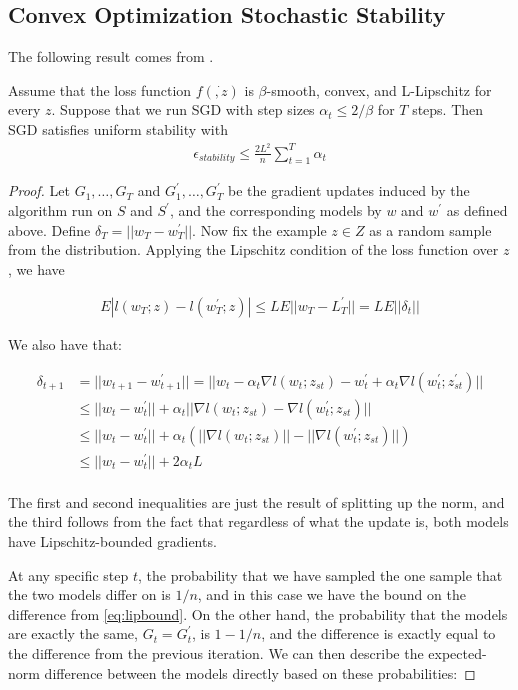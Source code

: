 \documentclass[12pt]{report}
\begin{document}
\subsection{Convex Optimization Stochastic Stability}
The following result comes from \cite{hardt2015train}.
\begin{theorem}
\label{ThmNeat}
Assume that the loss function $f(\dot{,z})$ is $\beta$-smooth, convex, and L-Lipschitz for every $z$. Suppose that we run SGD with step sizes $\alpha_t \leq 2/\beta$ for $T$ steps. Then SGD satisfies uniform stability with
\begin{align}
\epsilon_{stability} \leq \frac{2L^2}{n}\sum_{t=1}^T \alpha_t
\end{align}
\end{theorem}

\begin{proof}
Let $G_1,\ldots,G_T$ and $G_1^\prime,\ldots,G_T^\prime$ be the gradient updates induced by the algorithm run on $S$ and $S^\prime$, and the corresponding models by $w$ and $w^\prime$ as defined above. Define $\delta_T = ||w_T - w_T^\prime||$. Now fix the example $z \in Z$ as a random sample from the distribution. Applying the Lipschitz condition of the loss function over $z$, we have

\begin{align} \label{eq:explip}
E |l(w_T;z) - l(w_T^\prime;z)| \leq L E||w_T - L_T^\prime|| = L E||\delta_t||
\end{align}

We also have that:

\begin{align} \label{eq:lipbound}
\delta_{t+1} &= || w_{t+1} - w_{t+1}^\prime|| = ||w_t - \alpha_t \nabla l(w_t;z_{st}) - w_t^\prime + \alpha_t \nabla l(w_t^\prime;z_{st}^\prime) || \\
&\leq ||w_t - w_t^\prime|| + \alpha_t ||\nabla l(w_t;z_{st}) - \nabla l(w_t^\prime;z_{st})|| \\
&\leq ||w_t - w_t^\prime|| + \alpha_t( ||\nabla l(w_t;z_{st})|| - ||\nabla l(w_t^\prime;z_{st})|| )\\
&\leq ||w_t - w_t^\prime|| + 2\alpha_t L \\
\end{align}

The first and second inequalities are just the result of splitting up the norm, and the third follows from the fact that regardless of what the update is, both models have Lipschitz-bounded gradients.

At any specific step $t$, the probability that we have sampled the one sample that the two models differ on is $1/n$, and in this case we have the bound on the difference from \ref{eq:lipbound}. On the other hand, the probability that the models are exactly the same, $G_t = G_t^\prime$, is $1-1/n$, and the difference is exactly equal to the difference from the previous iteration. We can then describe the expected-norm difference between the models directly based on these probabilities:


\end{proof}
\end{document}
